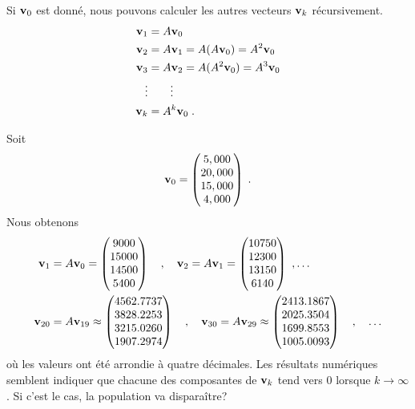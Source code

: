 {\begin{egg}
Si $\mathbf{v}_0$ est donné, nous pouvons calculer les autres vecteurs
$\mathbf{v}_k$ récursivement.
\begin{align*}
\mathbf{v}_1 &= A \mathbf{v}_0 \\
\mathbf{v}_2 &= A \mathbf{v}_1  = A (A \mathbf{v}_0) = A^2\mathbf{v}_0  \\
\mathbf{v}_3 &= A \mathbf{v}_2  = A (A^2 \mathbf{v}_0) = A^3\mathbf{v}_0  \\
\vdots & \qquad \vdots \\
\mathbf{v}_k &= A^k \mathbf{v}_0 \; .
\end{align*}

Soit
\[
\mathbf{v}_0 = \begin{pmatrix} 5,000\\ 20,000 \\ 15,000 \\ 4,000 \end{pmatrix}\; .
\]
Nous obtenons
\begin{align*}
\mathbf{v}_1 &= A \mathbf{v}_0 =
\begin{pmatrix} 9000 \\ 15000 \\ 14500 \\ 5400 \end{pmatrix}
\quad, \quad
\mathbf{v}_2 = A \mathbf{v}_1 =
\begin{pmatrix} 10750 \\ 12300 \\ 13150 \\ 6140 \end{pmatrix} \ , \ldots \\
\mathbf{v}_{20} &= A \mathbf{v}_{19} \approx
\begin{pmatrix}
4562.7737 \\ 3828.2253 \\ 3215.0260 \\ 1907.2974
\end{pmatrix}
\quad , \quad
\mathbf{v}_{30} = A \mathbf{v}_{29} \approx
\begin{pmatrix}
2413.1867 \\ 2025.3504 \\ 1699.8553 \\ 1005.0093
\end{pmatrix}
\quad , \quad \ldots
\end{align*}
où les valeurs ont été arrondie à quatre décimales.  Les résultats
numériques semblent indiquer que chacune des composantes de
$\mathbf{v}_k$ tend vers $0$ lorsque $k\rightarrow \infty$.  Si c'est le
cas, la population va disparaître? 


\end{egg}}
